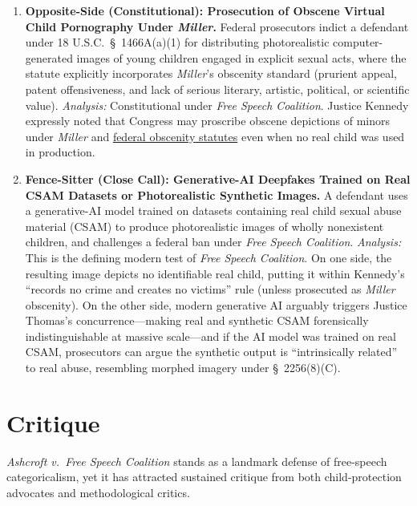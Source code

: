 \documentclass[12pt]{article}
\begin{document}
\begin{enumerate}
\item \textbf{Opposite-Side (Constitutional): Prosecution of Obscene Virtual Child Pornography Under \textit{Miller}.} Federal prosecutors indict a defendant under 18 U.S.C.\ \S~1466A(a)(1) for distributing photorealistic computer-generated images of young children engaged in explicit sexual acts, where the statute explicitly incorporates \textit{Miller}'s obscenity standard (prurient appeal, patent offensiveness, and lack of serious literary, artistic, political, or scientific value). \textit{Analysis:} Constitutional under \textit{Free Speech Coalition}. Justice Kennedy expressly noted that Congress may proscribe obscene depictions of minors under \textit{Miller} and \href{https://www.law.cornell.edu/constitution-conan/amendment-1/child-pornography}{federal obscenity statutes} even when no real child was used in production.
\item \textbf{Fence-Sitter (Close Call): Generative-AI Deepfakes Trained on Real CSAM Datasets or Photorealistic Synthetic Images.} A defendant uses a generative-AI model trained on datasets containing real child sexual abuse material (CSAM) to produce photorealistic images of wholly nonexistent children, and challenges a federal ban under \textit{Free Speech Coalition}. \textit{Analysis:} This is the defining modern test of \textit{Free Speech Coalition}. On one side, the resulting image depicts no identifiable real child, putting it within Kennedy's ``records no crime and creates no victims'' rule (unless prosecuted as \textit{Miller} obscenity). On the other side, modern generative AI arguably triggers Justice Thomas's concurrence---making real and synthetic CSAM forensically indistinguishable at massive scale---and if the AI model was trained on real CSAM, prosecutors can argue the synthetic output is ``intrinsically related'' to real abuse, resembling morphed imagery under \S~2256(8)(C).
\end{enumerate}

\section{Critique}

\textit{Ashcroft v.\ Free Speech Coalition} stands as a landmark defense of free-speech categoricalism, yet it has attracted sustained critique from both child-protection advocates and methodological critics.
\end{document}

